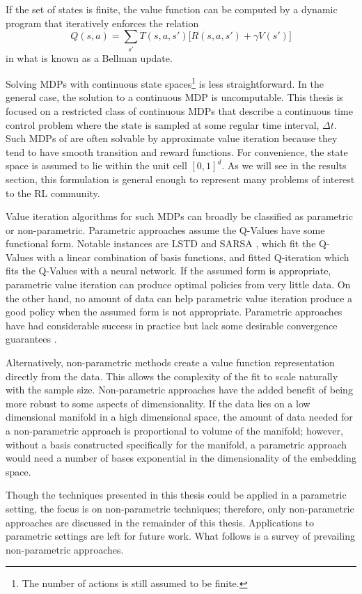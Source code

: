 If the set of states is finite, the value function can be computed by a
dynamic program that iteratively enforces the relation
$$ Q(s,a) = \sum_{s'} T(s,a,s')\big[R(s,a,s') + \gamma V(s')\big] $$
in what is known as a Bellman update.

Solving MDPs with continuous state spaces\footnote{The number of actions is
still assumed to be finite.} is less straightforward.
In the general case, the solution to a continuous MDP is uncomputable.
This thesis is focused on a restricted class of continuous MDPs that describe
a continuous time control problem where the state is sampled at some regular
time interval, $\Delta t$.
Such MDPs of are often solvable by
approximate value iteration because they tend to have smooth transition and
reward functions.
For convenience, the state space is assumed to lie within the unit cell
$[0,1]^d$.
As we will see in the results section, this formulation is general enough to
represent many problems of interest to the RL community.

Value iteration algorithms for such MDPs can broadly be classified as
parametric or non-parametric.
Parametric approaches assume the Q-Values have some functional form.
Notable instances are LSTD \cite{lstd} and SARSA \cite{sarsa}, which fit the
Q-Values with a linear combination of basis functions, and fitted Q-iteration
\cite{fqi} which fits the Q-Values with a neural network.
If the assumed form is appropriate, parametric value iteration
can produce optimal policies from very little data.
On the other hand, no amount of data
can help parametric value iteration produce a good policy when the assumed
form is not appropriate.
Parametric approaches have had considerable success in practice \cite{rlai}
\cite{rlsa}
but lack some desirable convergence guarantees \cite{five} \cite{three}.

Alternatively, non-parametric methods create a value function representation
directly from the data.
This allows the complexity of the fit to scale naturally with the sample size.
Non-parametric approaches have the added benefit of being more robust to
some aspects of dimensionality.
If the data lies on a low dimensional manifold in a high dimensional space,
the amount of data needed for a non-parametric approach is proportional to
volume of the manifold; however, without a basis constructed specifically for
the manifold, a parametric approach would need a number of bases exponential
in the dimensionality of the embedding space.

Though the techniques presented in this thesis could be applied in a parametric
setting, the focus is on non-parametric techniques; therefore, only
non-parametric approaches are discussed in the remainder of this thesis.
Applications to parametric settings are left for future work.
What follows is a survey of prevailing non-parametric approaches.

